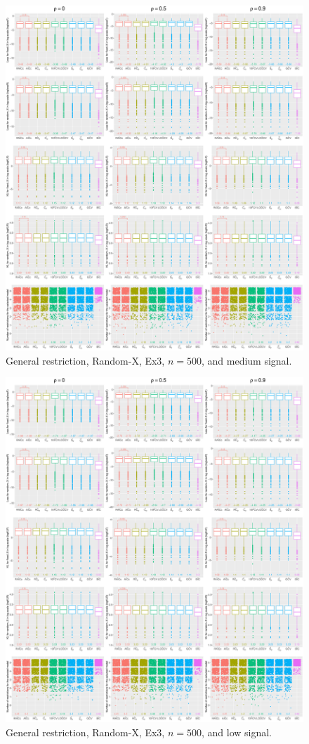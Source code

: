 \clearpage
\begin{figure}[!ht]
\centering
\includegraphics[width=\textwidth]{figures/supplement/randomx/general_restriction/Ex3_n500_msnr.eps}
\caption{General restriction, Random-X, Ex3, $n=500$, and medium signal.}
\end{figure}
\clearpage
\begin{figure}[!ht]
\centering
\includegraphics[width=\textwidth]{figures/supplement/randomx/general_restriction/Ex3_n500_lsnr.eps}
\caption{General restriction, Random-X, Ex3, $n=500$, and low signal.}
\end{figure}
\clearpage
